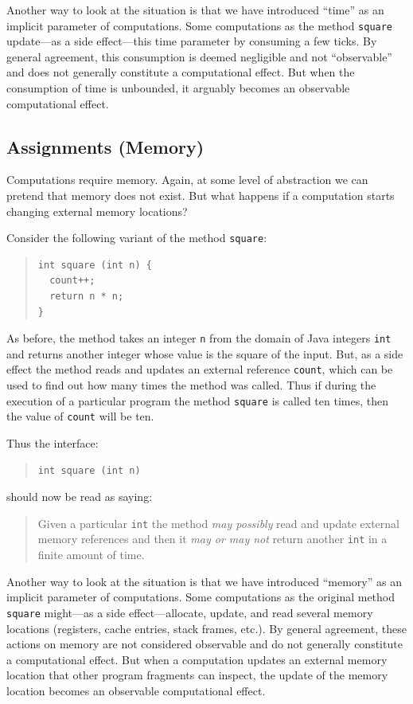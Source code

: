 \documentclass{article}
\theoremstyle{remark}
\begin{document}
Another way to look at the situation is that we have introduced ``time'' as
an implicit parameter of computations. Some computations as the method
\verb|square| update---as a side effect---this time parameter by consuming a
few ticks. By general agreement, this consumption is deemed negligible and
not ``observable'' and does not generally constitute a computational
effect. But when the consumption of time is unbounded, it arguably becomes an
observable computational effect.

\subsection*{Assignments (Memory)}

Computations require memory. Again, at some level of abstraction we can
pretend that memory does not exist. But what happens if a computation
starts changing external memory locations? 

Consider the following variant of the method \verb.square.:
\begin{quote}
\begin{verbatim}
int square (int n) {
  count++;
  return n * n;
}
\end{verbatim}
\end{quote}
As before, the method takes an integer \verb.n. from the domain of Java
integers \verb.int. and returns another integer whose value is the square of
the input. But, as a side effect the method reads and updates an external
reference \verb.count., which can be used to find out how many times the
method was called. Thus if during the execution of a particular program the
method \verb.square. is called ten times, then the value of \verb.count. will
be ten.

Thus the interface:
\begin{quote}
\begin{verbatim}
int square (int n)
\end{verbatim}
\end{quote}
should now be read as saying:
\begin{quote}
Given a particular \verb|int| the method \emph{may possibly} read and update
external memory references and then it \emph{may or may not} return another
\verb|int| in a finite amount of time.
\end{quote}

Another way to look at the situation is that we have introduced ``memory'' as
an implicit parameter of computations. Some computations as the original
method \verb|square| might---as a side effect---allocate, update, and read
several memory locations (registers, cache entries, stack frames, etc.). By
general agreement, these actions on memory are not considered observable and
do not generally constitute a computational effect. But when a computation
updates an external memory location that other program fragments can inspect,
the update of the memory location becomes an observable computational effect.
\end{document}
